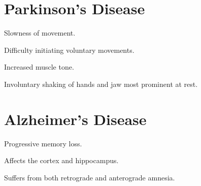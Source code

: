 \section{Parkinson's Disease}
\begin{coloredlist}
    \item {}
    \begin{coloredlist}
        \item Slowness of movement.
    \end{coloredlist}
    \item {}
    \begin{coloredlist}
        \item Difficulty initiating voluntary movements.
    \end{coloredlist}
    \item {}
    \begin{coloredlist}
        \item Increased muscle tone.
    \end{coloredlist}
    \item {}
    \begin{coloredlist}
        \item Involuntary shaking of hands and jaw most prominent at rest.
    \end{coloredlist}
\end{coloredlist}

\section{Alzheimer's Disease}

\begin{coloredlist}
    \item Progressive memory loss.
    \item Affects the cortex and hippocampus.
    \item Suffers from both retrograde and anterograde amnesia.
\end{coloredlist}


